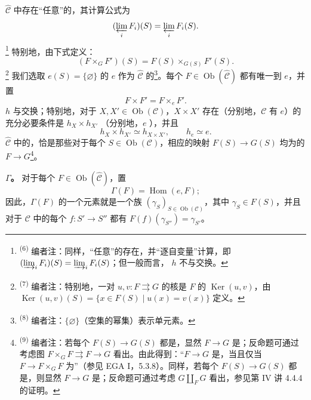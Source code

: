 $\widehat{\mathcal C}$ 中存在“任意”的，其计算公式为
\[
(\varprojlim_i F_i)(S)=\varprojlim_i F_i(S).
\]
\footnote{\textsuperscript{(6)} 编者注：同样，“任意”的存在，并“逐自变量”计算，即 $(\varinjlim_iF_i)(S)=\varinjlim_iF_i(S)$；但一般而言， $h$ 不与交换。}
特别地，由下式定义：
\[
(F\times_G F')(S)=F(S)\times_{G(S)}F'(S).
\]
\footnote{\textsuperscript{(7)} 编者注：特别地，一对 $u,v:F\rightrightarrows G$ 的核是 $F$ 的 $\operatorname{Ker}(u,v)$，由 $\operatorname{Ker}(u,v)(S)=\{x\in F(S)\mid u(x)=v(x)\}$ 定义。}
我们选取 $e(S)=\{\varnothing\}$ 的 $e$ 作为 $\widehat{\mathcal C}$ 的\footnote{\textsuperscript{(8)} 编者注：$\{\varnothing\}$（空集的幂集）表示单元素。}。每个 $F\in\operatorname{Ob}(\widehat{\mathcal C})$ 都有唯一到 $e$，并置
\[
F\times F'=F\times_eF'.
\]
 $h$ 与交换；特别地，对于 $X,X'\in\operatorname{Ob}(\mathcal C)$，$X\times X'$ 存在（分别地，$\mathcal C$ 有 $e$）的充分必要条件是 $h_X\times h_{X'}$ （分别地，$e$ ），并且
\[
h_X\times h_{X'}\simeq h_{X\times X'},\qquad h_e\simeq e.
\]
$\widehat{\mathcal C}$ 中的，恰是那些对于每个 $S\in\operatorname{Ob}(\mathcal C)$，相应的映射 $F(S)\to G(S)$ 均为的 $F\to G$\footnote{\textsuperscript{(9)} 编者注：若每个 $F(S)\to G(S)$ 都是，显然 $F\to G$ 是；反命题可通过考虑图 $F\times_GF\rightrightarrows F\to G$ 看出。由此得到：“$F\to G$ 是，当且仅当 $F\to F\times_GF$ 为”（参见 EGA I，5.3.8）。同样，若每个 $F(S)\to G(S)$ 都是，则显然 $F\to G$ 是；反命题可通过考虑 $G\amalg_FG$ 看出，参见第 IV 讲 4.4.4 的证明。}。

\textbf{ $\Gamma$。} 对于每个 $F\in\operatorname{Ob}(\widehat{\mathcal C})$，置
\[
\Gamma(F)=\operatorname{Hom}(e,F);
\]
因此，$\Gamma(F)$ 的一个元素就是一个族 $(\gamma_S)_{S\in\operatorname{Ob}(\mathcal C)}$，其中 $\gamma_S\in F(S)$，并且对于 $\mathcal C$ 中的每个 $f:S'\to S''$ 都有 $F(f)(\gamma_{S''})=\gamma_{S'}$。

